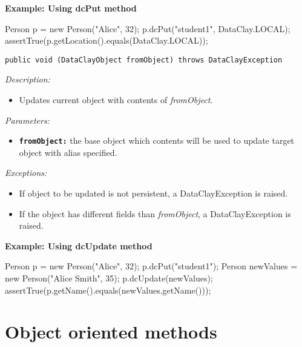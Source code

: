 \begin{tBox}
\textcolor{basecolor} {\bf Example: Using dcPut method}
\begin{java}
Person p = new Person("Alice", 32);
p.dcPut("student1", DataClay.LOCAL);
assertTrue(p.getLocation().equals(DataClay.LOCAL));
\end{java}
\end{tBox}



\begin{dBox}
\texttt{public void  (DataClayObject fromObject) throws DataClayException}
\LINE

{\it Description:}

\begin{itemize}
    \item Updates current object with contents of \textit{fromObject}.
\end{itemize}

{\it Parameters:}
\begin{itemize}
    \item \texttt{\bfseries fromObject:} the base object which contents will be used to update target object with alias specified.
\end{itemize}

{\it Exceptions:}

\begin{itemize}
    \item If object to be updated is not persistent, a DataClayException is raised.
    \item If the object has different fields than \textit{fromObject}, a DataClayException is raised.
\end{itemize}

\end{dBox}

\begin{tBox}
\textcolor{basecolor} {\bf Example: Using dcUpdate method}
\begin{java}
Person p = new Person("Alice", 32);
p.dcPut("student1");
Person newValues = new Person("Alice Smith", 35);
p.dcUpdate(newValues);
assertTrue(p.getName().equals(newValues.getName()));
\end{java}
\end{tBox}



\section{Object oriented methods}
\label{sec:JavaObjectExtendedMethods}

